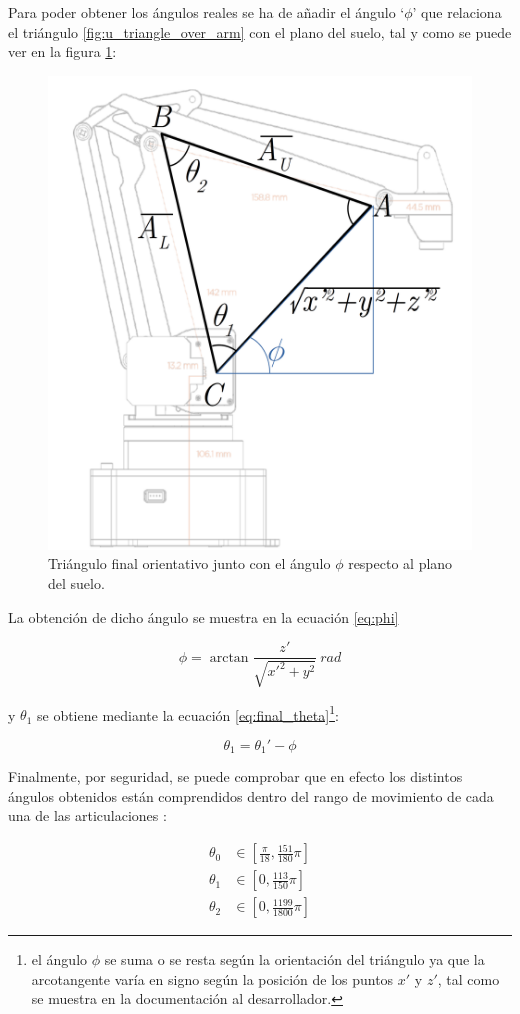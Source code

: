 Para poder obtener los ángulos reales se ha de añadir el ángulo `$\phi$' que relaciona el triángulo
\ref{fig:u_triangle_over_arm} con el plano del suelo, tal y como se puede ver en la figura
\ref{fig:final_triangle}:

\begin{figure}[H]
    \centering
    \includegraphics[width=.5\linewidth]{pictures/ik_final.png}
    \caption{Triángulo final orientativo junto con el ángulo $\phi$ respecto al plano del suelo.}
    \label{fig:final_triangle}
\end{figure}

La obtención de dicho ángulo se muestra en la ecuación \ref{eq:phi}

\begin{equation}\label{eq:phi}
    \phi = \arctan{\frac{z'}{\sqrt{x'^2 + y^2}}}~rad
\end{equation}

y $\theta_1$ se obtiene mediante la ecuación
\ref{eq:final_theta}\footnote{el ángulo $\phi$ se suma o se resta según la orientación
    del triángulo ya que la arcotangente varía en signo según la posición de los puntos
    $x'$ y $z'$, tal como se muestra en la documentación al desarrollador\cite{UArmDeveloperSwiftProForArduino}.}:

\begin{equation}\label{eq:final_theta}
    \theta_1 = \theta_1' - \phi
\end{equation}

Finalmente, por seguridad, se puede comprobar que en efecto los distintos ángulos obtenidos
están comprendidos dentro del rango de movimiento de cada una de las articulaciones
\cite{UArmDeveloperSwiftProForArduino}:

\begin{align*}
    \theta_0 & \in \left[\frac{\pi}{18}, \frac{151}{180}\pi\right] \\
    \theta_1 & \in \left[0, \frac{113}{150}\pi\right]              \\
    \theta_2 & \in \left[0, \frac{1199}{1800}\pi\right]
\end{align*}